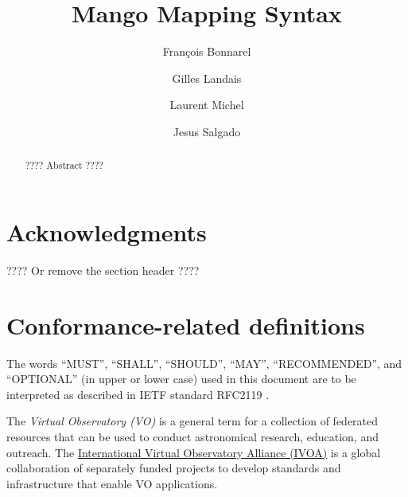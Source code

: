 \documentclass[11pt,a4paper]{ivoa}
\title{Mango Mapping Syntax}
\author{François Bonnarel}
\author{Gilles Landais}
\author{Laurent Michel}
\author{Jesus Salgado}
\begin{document}
\begin{abstract}
???? Abstract ????
\end{abstract}


\section*{Acknowledgments}

???? Or remove the section header ????

\section*{Conformance-related definitions}

The words ``MUST'', ``SHALL'', ``SHOULD'', ``MAY'', ``RECOMMENDED'', and
``OPTIONAL'' (in upper or lower case) used in this document are to be
interpreted as described in IETF standard RFC2119 \citep{std:RFC2119}.

The \emph{Virtual Observatory (VO)} is a
general term for a collection of federated resources that can be used
to conduct astronomical research, education, and outreach.
The \href{http://www.ivoa.net}{International
Virtual Observatory Alliance (IVOA)} is a global
collaboration of separately funded projects to develop standards and
infrastructure that enable VO applications.
\end{document}
